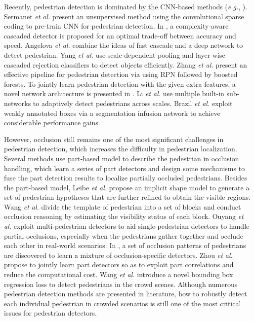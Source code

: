 \documentclass[runningheads]{llncs}
\def\eg{{\em e.g.}}
\def\etal{{\em et al. }}
\begin{document}
Recently, pedestrian detection is dominated by the CNN-based methods (\eg, \cite{DBLP:conf/cvpr/SermanetKCL13,DBLP:conf/cvpr/HosangOBS15,DBLP:conf/cvpr/TianLWT15,DBLP:conf/eccv/CaiFFV16,DBLP:conf/iccv/YangYLL15,DBLP:conf/iccv/BrazilYL17}). Sermanet \etal \cite{DBLP:conf/cvpr/SermanetKCL13} present an unsupervised method using the convolutional sparse coding to pre-train CNN for pedestrian detection. In \cite{DBLP:conf/iccv/CaiSV15}, a complexity-aware cascaded detector is proposed for an optimal trade-off between accuracy and speed. Angelova \etal \cite{DBLP:conf/bmvc/AngelovaKVOF15} combine the ideas of fast cascade and a deep network to detect pedestrian. Yang \etal \cite{DBLP:conf/cvpr/YangCL16} use scale-dependent pooling and layer-wise cascaded rejection classifiers to detect objects efficiently. Zhang \etal \cite{DBLP:conf/eccv/ZhangLLH16} present an effective pipeline for pedestrian detection via using RPN followed by boosted forests. To jointly learn pedestrian detection with the given extra features, a novel network architecture is presented in \cite{DBLP:conf/cvpr/MaoXJC17}. Li \etal \cite{DBLP:journals/tm/li2017scale} use multiple built-in sub-networks to adaptively detect pedestrians across scales. Brazil \etal \cite{DBLP:conf/iccv/BrazilYL17} exploit weakly annotated boxes via a segmentation infusion network to achieve considerable performance gains.


However, occlusion still remains one of the most significant challenges in pedestrian detection, which increases the difficulty in pedestrian localization. Several methods \cite{DBLP:conf/cvpr/OuyangW12,DBLP:conf/iccv/OuyangW13,DBLP:conf/iccv/TianLWT15,DBLP:conf/iccv/MathiasBTG13,DBLP:conf/accv/ZhouY16,DBLP:conf/iccv/WuN05,DBLP:conf/cvpr/ShetNRD07,DBLP:conf/cvpr/EnzweilerESG10,DBLP:conf/eccv/DuanAL10} use part-based model to describe the pedestrian in occlusion handling, which learn a series of part detectors and design some mechanisms to fuse the part detection results to localize partially occluded pedestrians. Besides the part-based model, Leibe \etal \cite{DBLP:conf/cvpr/LeibeSS05} propose an implicit shape model to generate a set of pedestrian hypotheses that are further refined to obtain the visible regions. Wang \etal \cite{DBLP:conf/iccv/WangHY09} divide the template of pedestrian into a set of blocks and conduct occlusion reasoning by estimating the visibility status of each block. Ouyang \etal \cite{DBLP:conf/cvpr/OuyangW13} exploit multi-pedestrian detectors to aid single-pedestrian detectors to handle partial occlusions, especially when the pedestrians gather together and occlude each other in real-world scenarios. In \cite{DBLP:conf/bmvc/TangAS12,DBLP:conf/cvpr/PepikSGS13}, a set of occlusion patterns of pedestrians are discovered to learn a mixture of occlusion-specific detectors. Zhou \etal \cite{DBLP:conf/iccv/ZhouY17} propose to jointly learn part detectors so as to exploit part correlations and reduce the computational cost. Wang \etal \cite{DBLP:journals/corr/abs-1711-07752} introduce a novel bounding box regression loss to detect pedestrians in the crowd scenes. Although numerous pedestrian detection methods are presented in literature, how to robustly detect each individual pedestrian in crowded scenarios is still one of the most critical issues for pedestrian detectors.
\end{document}
